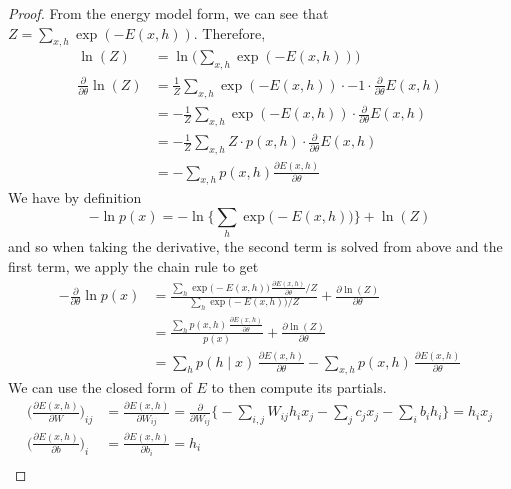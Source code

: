 \documentclass{article}
\begin{document}
    \begin{proof}
      From the energy model form, we can see that $Z = \sum_{x, h} \exp(-E(x, h))$. Therefore, 
      \begin{align}
        \ln(Z) & = \ln \bigg( \sum_{x, h} \exp(-E(x, h)) \bigg) \\ 
        \frac{\partial}{\partial \theta} \ln(Z) & = \frac{1}{Z} \sum_{x, h} \exp(-E(x, h)) \cdot -1 \cdot \frac{\partial}{\partial \theta} E(x, h) \\
               & = -\frac{1}{Z} \sum_{x, h} \exp(-E(x, h)) \cdot \frac{\partial}{\partial \theta} E(x, h) \\
               & = -\frac{1}{Z} \sum_{x, h} Z \cdot p(x, h) \cdot \frac{\partial}{\partial \theta} E(x, h) \\
               & = - \sum_{x, h} p(x, h) \frac{\partial E(x, h)}{\partial \theta}
      \end{align}
      We have by definition 
      \begin{equation} 
        -\ln p(x) = - \ln \bigg\{ \sum_{h} \exp \big( -E(x, h) \big) \bigg\} + \ln(Z)
      \end{equation}
      and so when taking the derivative, the second term is solved from above and the first term, we apply the chain rule to get 
      \begin{align} 
        -\frac{\partial}{\partial \theta} \ln p(x) & = \frac{\sum_{h} \exp \big( -E(x, h) \big) \, \frac{\partial E(x, h)}{\partial \theta} / Z}{\sum_{h} \exp \big( -E (x, h) \big) / Z} + \frac{\partial \ln(Z)}{\partial \theta} \\
                                                                         & = \frac{\sum_{h} p(x, h) \, \frac{\partial E(x, h)}{\partial \theta}}{p(x)} + \frac{\partial \ln(Z)}{\partial \theta} \\
                                                                         & = \sum_{h} p(h \mid x) \, \frac{\partial E(x, h)}{\partial \theta} - \sum_{x, h} p(x, h) \, \frac{\partial E(x, h)}{\partial \theta} 
      \end{align} 
      We can use the closed form of $E$ to then compute its partials. 
      \begin{align}
        \bigg( \frac{\partial E(x, h)}{\partial W} \bigg)_{ij} & = \frac{\partial E(x, h)}{\partial W_{ij}} = \frac{\partial}{\partial W_{ij}} \bigg\{ - \sum_{i,j} W_{ij} h_i x_j - \sum_j c_j x_j - \sum_i b_i h_i \bigg\} = h_i x_j \\
        \bigg( \frac{\partial E(x, h)}{\partial b} \bigg)_i & = \frac{\partial E(x, h)}{\partial b_i} = h_i  \\

\end{align}
\end{proof}
\end{document}
